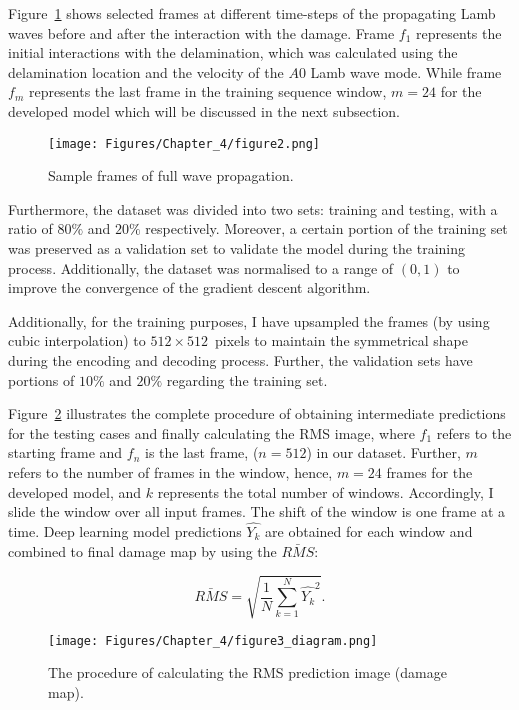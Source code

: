 Figure~\ref{fig:Full_wave} shows selected frames at different time-steps of the propagating Lamb waves before and after the interaction with the damage.
Frame \(f_{1}\) represents the initial interactions with the delamination, which was calculated using the delamination location and the velocity of the \(A0\) Lamb wave mode.
While frame \(f_{m}\) represents the last frame in the training sequence window, \(m=24\) for the developed model which will be discussed in the next subsection.
\begin{figure}[!h]
	\centering
	\texttt{[image: Figures/Chapter\_4/figure2.png]}
	\caption{Sample frames of full wave propagation.}
	\label{fig:Full_wave}
\end{figure}

Furthermore, the dataset was divided into two sets: training and testing, with a ratio of \(80\%\) and \(20\% \) respectively.
Moreover, a certain portion of the training set was preserved as a validation set to validate the model during the training process.
Additionally, the dataset was normalised to a range of \((0, 1)\) to improve the convergence of the gradient descent algorithm.

Additionally, for the training purposes, I have upsampled the frames (by using cubic interpolation) to \(512\times512\)~pixels to maintain the symmetrical shape during the encoding and decoding process.
Further, the validation sets have portions of \(10\%\) and \(20\%\) regarding the training set.

Figure~\ref{fig:Diagram_exp_predictions} illustrates the complete procedure of obtaining intermediate predictions for the testing cases and finally calculating the RMS image, where \(f_{1}\) refers to the starting frame and \(f_{n}\) is the last frame, (\(n=512\)) in our dataset.
Further, \(m\) refers to the number of frames in the window, hence, \(m=24\) frames for the developed model, and \(k\) represents the total number of windows.
Accordingly, I slide the window over all input frames.
The shift of the window is one frame at a time.
Deep learning model predictions \(\hat{Y_k}\) are obtained for each window and combined to final damage map by using the $\bar{RMS}$:

\begin{equation}
	\bar{RMS} = \sqrt{\frac{1}{N}\sum_{k=1}^{N}\hat{Y_k}^2}.	
	\label{RMS}
\end{equation}
\begin{figure}[!h]
	\centering
	\texttt{[image: Figures/Chapter\_4/figure3\_diagram.png]}
	\caption{The procedure of calculating the RMS prediction image (damage map).}
	\label{fig:Diagram_exp_predictions}
\end{figure}
